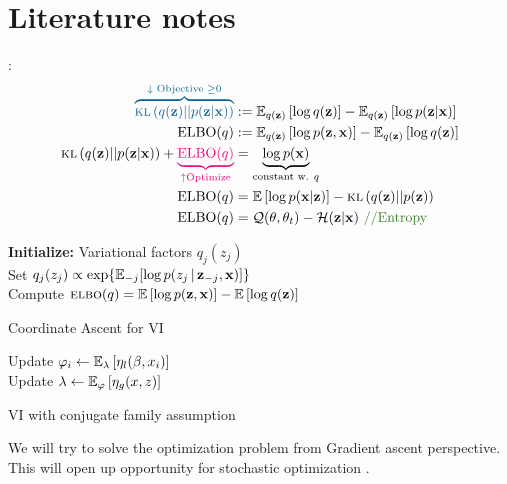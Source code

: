 \documentclass[summaries.tex]{subfiles}
\begin{document}
\section{Literature notes}

: \cite{blei2016variational}  \\
\INPROGRESS
\begin{align}
  \blue{\overbrace{\kl{q(\bz)||p(\bz|\bx)}}^{\downarrow\text{ Objective } \geq 0} } &:= 
  \EEE{q(\bz)}{\log q(\bz)} - \EEE{q(\bz)}{\log p(\bz | \bx)} \\
  \text{ELBO}(q) &:= \EEE{q(\bz)}{\log p(\bz, \bx)} - \EEE{q(\bz)}{\log q(\bz)} \\
  \kl{q(\bz)||p(\bz|\bx)} + \magenta{\underbrace{\text{ELBO}(q)}_{\uparrow \text{Optimize}}}
                 &= \underbrace{\log p(\bx)}_{\text{constant w. } q} \\
  \text{ELBO}(q) &= \EE{\log p(\bx | \bz)} - \kl{q(\bz) || p(\bz)} \\
  \text{ELBO}(q) &= \cQ(\theta, \theta_t) - \mathcal{H}(\bz|\bx) \text{ \comm{ //Entropy}}
\end{align}
\begin{algorithm}[h]
  \textbf{Initialize:} Variational factors $q_{j}(z_j)$ \\
   {
     {
      Set $q_{j}(z_j) \propto \exp\{\mathbb{E}_{-j}[\log p(z_j \,\vert\, \mathbf{z}_{-j}, \mathbf{x})]\}$\\
    }
    Compute $\textsc{elbo}(q) = \mathbb{E}\left[\log p(\mathbf{z}, \mathbf{x})\right] - \mathbb{E}\left[\log q(\mathbf{z})\right]$
  }
  \caption{Coordinate Ascent for VI}
  \label{alg:cavi}
\end{algorithm}

 \cite{pgmai18}
\begin{algorithm}[h]
   {
     {
      Update $\varphi_i \gets \mathbb{E}_{\lambda}\left[\eta_l(\beta, x_i)\right]$\\
    }
    Update $\lambda \gets \mathbb{E}_{\varphi}\left[\eta_g(x, z)\right]$\\
  }
  \caption{VI with conjugate family assumption}
  \label{alg:vi_conj}
\end{algorithm}

We will try to solve the optimization problem from Gradient ascent perspective.
This will open up opportunity for stochastic optimization \cite{robbins1951stochastic}
\cite{robbins1985stochastic}.
\end{document}
